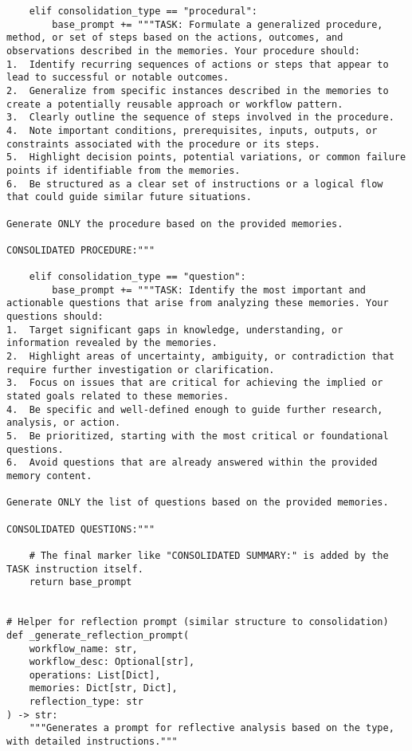 \documentclass[12pt,a4paper]{article}
\begin{document}
\begin{pageablecode}
\begin{verbatim}
    elif consolidation_type == "procedural":
        base_prompt += """TASK: Formulate a generalized procedure, method, or set of steps based on the actions, outcomes, and observations described in the memories. Your procedure should:
1.  Identify recurring sequences of actions or steps that appear to lead to successful or notable outcomes.
2.  Generalize from specific instances described in the memories to create a potentially reusable approach or workflow pattern.
3.  Clearly outline the sequence of steps involved in the procedure.
4.  Note important conditions, prerequisites, inputs, outputs, or constraints associated with the procedure or its steps.
5.  Highlight decision points, potential variations, or common failure points if identifiable from the memories.
6.  Be structured as a clear set of instructions or a logical flow that could guide similar future situations.

Generate ONLY the procedure based on the provided memories.

CONSOLIDATED PROCEDURE:"""

    elif consolidation_type == "question":
        base_prompt += """TASK: Identify the most important and actionable questions that arise from analyzing these memories. Your questions should:
1.  Target significant gaps in knowledge, understanding, or information revealed by the memories.
2.  Highlight areas of uncertainty, ambiguity, or contradiction that require further investigation or clarification.
3.  Focus on issues that are critical for achieving the implied or stated goals related to these memories.
4.  Be specific and well-defined enough to guide further research, analysis, or action.
5.  Be prioritized, starting with the most critical or foundational questions.
6.  Avoid questions that are already answered within the provided memory content.

Generate ONLY the list of questions based on the provided memories.

CONSOLIDATED QUESTIONS:"""

    # The final marker like "CONSOLIDATED SUMMARY:" is added by the TASK instruction itself.
    return base_prompt


# Helper for reflection prompt (similar structure to consolidation)
def _generate_reflection_prompt(
    workflow_name: str,
    workflow_desc: Optional[str],
    operations: List[Dict],
    memories: Dict[str, Dict],
    reflection_type: str
) -> str:
    """Generates a prompt for reflective analysis based on the type, with detailed instructions."""


\end{verbatim}
\end{pageablecode}
\end{document}
